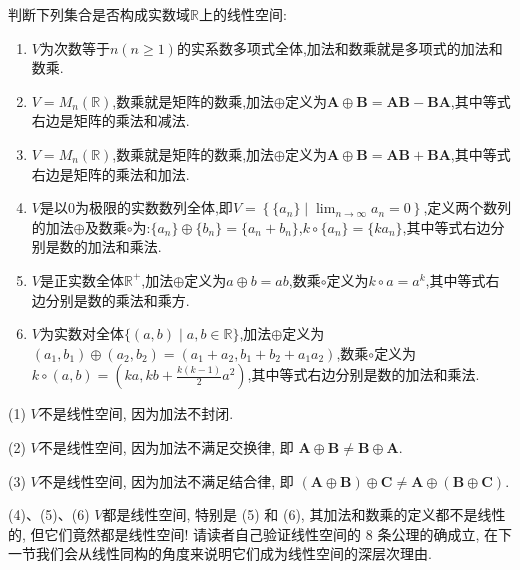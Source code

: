\documentclass[../../main.tex]{subfiles}%
\begin{document}
\begin{example}\label{example:3.3}
判断下列集合是否构成实数域\(\mathbb{R}\)上的线性空间:
\begin{enumerate}[(1)]
\item \(V\)为次数等于\(n(n\geqslant 1)\)的实系数多项式全体,加法和数乘就是多项式的加法和数乘.
\item \(V = M_n(\mathbb{R})\),数乘就是矩阵的数乘,加法\(\oplus\)定义为\(\boldsymbol{A}\oplus\boldsymbol{B}=\boldsymbol{A}\boldsymbol{B}-\boldsymbol{B}\boldsymbol{A}\),其中等式右边是矩阵的乘法和减法.
\item \(V = M_n(\mathbb{R})\),数乘就是矩阵的数乘,加法\(\oplus\)定义为\(\boldsymbol{A}\oplus\boldsymbol{B}=\boldsymbol{A}\boldsymbol{B}+\boldsymbol{B}\boldsymbol{A}\),其中等式右边是矩阵的乘法和加法.
\item \label{example:3.3(4)}\(V\)是以\(0\)为极限的实数数列全体,即\(V = \left\{\{a_n\}\mid\lim_{n\rightarrow\infty}a_n = 0\right\}\),定义两个数列的加法\(\oplus\)及数乘\(\circ\)为:\(\{a_n\}\oplus\{b_n\}=\{a_n + b_n\}\),\(k\circ\{a_n\}=\{ka_n\}\),其中等式右边分别是数的加法和乘法.
\item \label{example:3.3(5)}\(V\)是正实数全体\(\mathbb{R}^+\),加法\(\oplus\)定义为\(a\oplus b = ab\),数乘\(\circ\)定义为\(k\circ a = a^k\),其中等式右边分别是数的乘法和乘方.
\item \label{example:3.3(6)}\(V\)为实数对全体\(\{(a,b)\mid a,b\in\mathbb{R}\}\),加法\(\oplus\)定义为\((a_1,b_1)\oplus(a_2,b_2)=(a_1 + a_2,b_1 + b_2 + a_1a_2)\),数乘\(\circ\)定义为\(k\circ(a,b)=(ka,kb+\frac{k(k - 1)}{2}a^2)\),其中等式右边分别是数的加法和乘法.
\end{enumerate}
\end{example}
\begin{solution}
(1) \(V\)不是线性空间, 因为加法不封闭.

(2) \(V\)不是线性空间, 因为加法不满足交换律, 即 \(\boldsymbol{A}\oplus\boldsymbol{B}\neq\boldsymbol{B}\oplus\boldsymbol{A}\).

(3) \(V\)不是线性空间, 因为加法不满足结合律, 即 \((\boldsymbol{A}\oplus\boldsymbol{B})\oplus\boldsymbol{C}\neq\boldsymbol{A}\oplus(\boldsymbol{B}\oplus\boldsymbol{C})\).

(4)、(5)、(6) \(V\)都是线性空间, 特别是 (5) 和 (6), 其加法和数乘的定义都不是线性的, 但它们竟然都是线性空间! 请读者自己验证线性空间的 8 条公理的确成立, 在下一节我们会从线性同构的角度来说明它们成为线性空间的深层次理由.

\end{solution}
\end{document}
